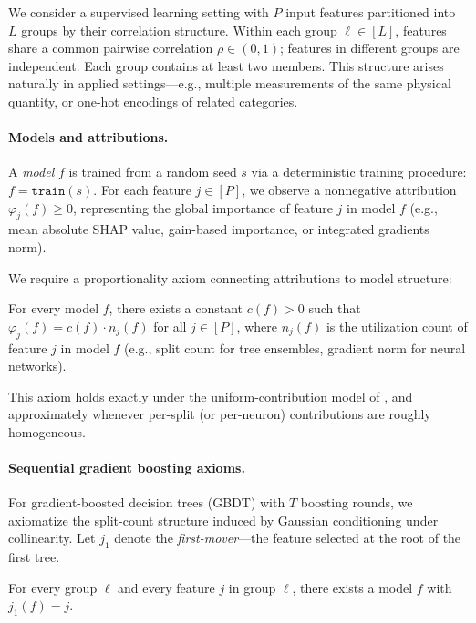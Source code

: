 \documentclass{jmlr}
\newcommand{\GBDT}{\textsc{GBDT}}
\begin{document}
We consider a supervised learning setting with $P$ input features partitioned into $L$ groups by their correlation structure.
Within each group $\ell \in [L]$, features share a common pairwise correlation $\rho \in (0,1)$; features in different groups are independent.
Each group contains at least two members.
This structure arises naturally in applied settings---e.g., multiple measurements of the same physical quantity, or one-hot encodings of related categories.

\paragraph{Models and attributions.}
A \emph{model} $f$ is trained from a random seed $s$ via a deterministic training procedure: $f = \texttt{train}(s)$.
For each feature $j \in [P]$, we observe a nonneg\-ative attribution $\varphi_j(f) \geq 0$, representing the global importance of feature $j$ in model $f$ (e.g., mean absolute SHAP value, gain-based importance, or integrated gradients norm).

We require a proportionality axiom connecting attributions to model structure:

\begin{axiom}[Proportionality]
\label{ax:proportional}
For every model $f$, there exists a constant $c(f) > 0$ such that $\varphi_j(f) = c(f) \cdot n_j(f)$ for all $j \in [P]$, where $n_j(f)$ is the utilization count of feature $j$ in model $f$ (e.g., split count for tree ensembles, gradient norm for neural networks).
\end{axiom}

This axiom holds exactly under the uniform-contribution model of \citet{lundberg2017unified}, and approximately whenever per-split (or per-neuron) contributions are roughly homogeneous.

\paragraph{Sequential gradient boosting axioms.}
For gradient-boosted decision trees (\GBDT{}) with $T$ boosting rounds, we axiomatize the split-count structure induced by Gaussian conditioning under collinearity.
Let $j_1$ denote the \emph{first-mover}---the feature selected at the root of the first tree.

\begin{axiom}
\label{ax:surjective}
For every group $\ell$ and every feature $j$ in group $\ell$, there exists a model $f$ with $j_1(f) = j$.
\end{axiom}
\end{document}
